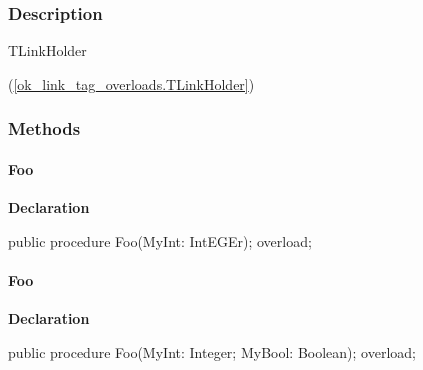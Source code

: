 \documentclass{report}
\begin{document}
\subsubsection*{\large{\textbf{Description}}\normalsize\hspace{1ex}\hfill}
\begin{ttfamily}TLinkHolder\end{ttfamily}(\ref{ok_link_tag_overloads.TLinkHolder})\subsubsection*{\large{\textbf{Methods}}\normalsize\hspace{1ex}\hfill}
\paragraph*{Foo}\hspace*{\fill}

\begin{list}{}{
\setlength{\itemindent}{0cm}
\setlength{\listparindent}{0cm}
\setlength{\leftmargin}{\evensidemargin}
\addtolength{\leftmargin}{\tmplength}
\settowidth{\labelsep}{X}
\addtolength{\leftmargin}{\labelsep}
\setlength{\labelwidth}{\tmplength}
}
\begin{flushleft}
\item[\textbf{Declaration}\hfill]
\begin{ttfamily}
public procedure Foo(MyInt: IntEGEr); overload;\end{ttfamily}


\end{flushleft}
\end{list}
\paragraph*{Foo}\hspace*{\fill}

\begin{list}{}{
\setlength{\itemindent}{0cm}
\setlength{\listparindent}{0cm}
\setlength{\leftmargin}{\evensidemargin}
\addtolength{\leftmargin}{\tmplength}
\settowidth{\labelsep}{X}
\addtolength{\leftmargin}{\labelsep}
\setlength{\labelwidth}{\tmplength}
}
\begin{flushleft}
\item[\textbf{Declaration}\hfill]
\begin{ttfamily}
public procedure Foo(MyInt: Integer; MyBool: Boolean); overload;\end{ttfamily}


\end{flushleft}
\end{list}
\end{document}
